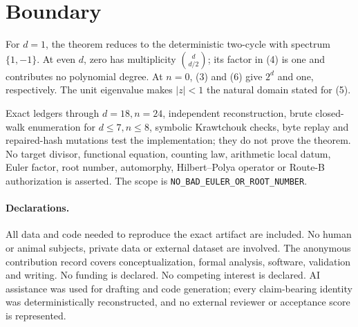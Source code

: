 \documentclass[10pt]{article}
\begin{document}
\section{Boundary}
For $d=1$, the theorem reduces to the deterministic two-cycle with spectrum
$\{1,-1\}$.  At even $d$, zero has multiplicity $\binom d{d/2}$; its factor
in (4) is one and contributes no polynomial degree.  At $n=0$, (3) and (6)
give $2^d$ and one, respectively.  The unit eigenvalue makes $|z|<1$ the
natural domain stated for (5).

Exact ledgers through $d=18,n=24$, independent reconstruction, brute
closed-walk enumeration for $d\leq7,n\leq8$, symbolic Krawtchouk checks, byte
replay and repaired-hash mutations test the implementation; they do not prove
the theorem.  No target divisor, functional equation, counting law,
arithmetic local datum, Euler factor, root number, automorphy,
Hilbert--Polya operator or Route-B authorization is asserted.  The scope is
\texttt{NO\_BAD\_EULER\_OR\_ROOT\_NUMBER}.

\paragraph{Declarations.}
All data and code needed to reproduce the exact artifact are included.  No
human or animal subjects, private data or external dataset are involved.  The
anonymous contribution record covers conceptualization, formal analysis,
software, validation and writing.  No funding is declared.  No competing
interest is declared.  AI assistance was used for drafting and code
generation; every claim-bearing identity was deterministically reconstructed,
and no external reviewer or acceptance score is represented.
\end{document}
